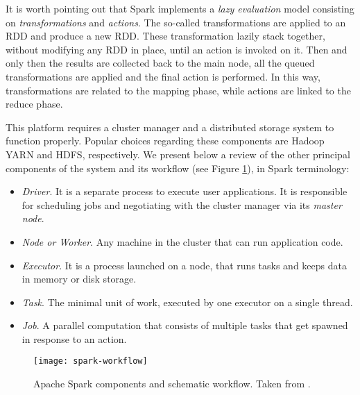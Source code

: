 It is worth pointing out that Spark implements a \textit{lazy evaluation} model consisting on \textit{transformations} and \textit{actions}. The so-called transformations are applied to an RDD and produce a new RDD. These transformation lazily stack together, without modifying any RDD in place, until an action is invoked on it. Then and only then the results are collected back to the main node, all the queued transformations are applied and the final action is performed. In this way, transformations are related to the mapping phase, while actions are linked to the reduce phase.

This platform requires a cluster manager and a distributed storage system to function properly. Popular choices regarding these components are Hadoop YARN and HDFS, respectively. We present below a review of the other principal components of the system and its workflow (see Figure \ref{fig:spark-workflow}), in Spark terminology:

\begin{itemize}
  \item \textit{Driver}. It is a separate process to execute user applications. It is responsible for scheduling jobs and negotiating with the cluster manager via its \textit{master node}.
  \item \textit{Node or Worker}. Any machine in the cluster that can run application code.
  \item \textit{Executor}. It is a process launched on a node, that runs tasks and keeps data in memory or disk storage.
   \item \textit{Task}. The minimal unit of work, executed by one executor on a single thread.
   \item \textit{Job}. A parallel computation that consists of multiple tasks that get spawned in response to an action.
\end{itemize}

\begin{figure}[h!]
  \centering
  \texttt{[image: spark-workflow]}
  \caption{Apache Spark components and schematic workflow. Taken from \cite{lopez2019distributed}.}
  \label{fig:spark-workflow}
\end{figure}
